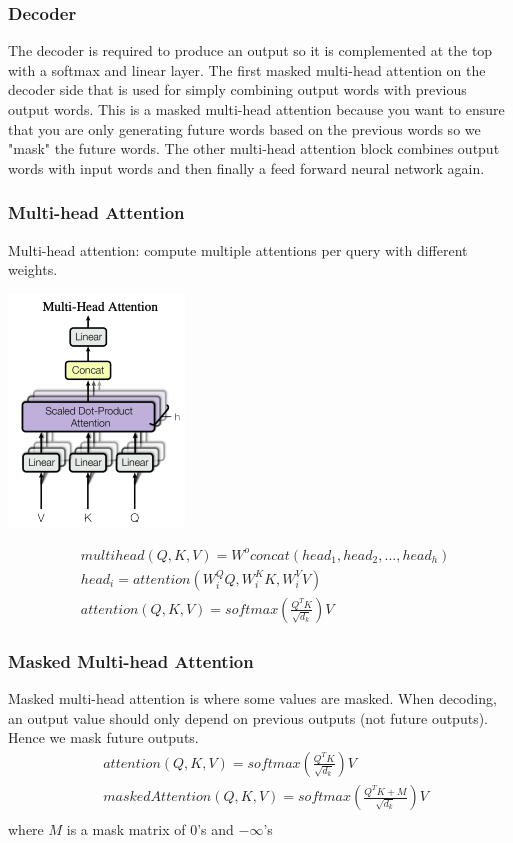 \documentclass[12pt]{article}
\begin{document}
        \subsubsection{Decoder}
            The decoder is required to produce an output so it is complemented at the top with a softmax and linear
            layer. The first masked multi-head attention on the decoder side that is used for simply combining output
            words with previous output words. This is a masked multi-head attention because you want to ensure that you
            are only generating future words based on the previous words so we "mask" the future words. The other
            multi-head attention block combines output words with input words and then finally a feed forward neural
            network again. 

        \subsubsection{Multi-head Attention}
            Multi-head attention: compute multiple attentions per query with different weights.
            
            \begin{center}
                \includegraphics[scale=0.65]{MultiAttention}
            \end{center}
            \begin{align*}
                & multihead(Q,K,V) = W^o concat(head_1, head_2, ..., head_h) \\
                & head_i = attention(W_i^QQ, W_i^KK, W_i^VV) \\
                & attention(Q,K,V) = softmax(\frac{Q^TK}{\sqrt{d_k}})V
            \end{align*}
        
        \subsubsection{Masked Multi-head Attention}
            Masked multi-head attention is where some values are masked. When decoding, an output value should only
            depend on previous outputs (not future outputs). Hence we mask future outputs. 
            \begin{align*}
                & attention(Q,K,V) = softmax(\frac{Q^TK}{\sqrt{d_k}})V \\
                & maskedAttention(Q, K, V) = softmax(\frac{Q^TK + M}{\sqrt{d_k}})V \\
            \end{align*}
            where $M$ is a mask matrix of 0's and $-\infty$'s
        
\end{document}

